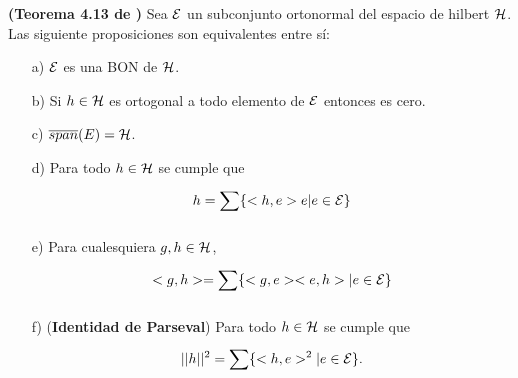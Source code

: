 \begin{teo} \label{thm: Coway, 4.13}
\textbf{(Teorema 4.13 de \cite{conway} )}
Sea $\mathcal{E}$ un subconjunto ortonormal del espacio
de hilbert $\mathcal{H}$.
Las siguiente proposiciones son equivalentes entre sí:
\begin{itemize}
\item[a)] $\mathcal{E}$ es una BON de $\mathcal{H}$.
\item[b)] Si $h \in \mathcal{H}$ es ortogonal a todo elemento de 
$\mathcal{E}$ entonces es cero.
\item[c)] $\overline{span}(E)= \mathcal{H} $.
\item[d)] Para todo $h \in \mathcal{H}$ se cumple que
\[
h = \sum\limits_{}^{}\{ <h,e> e | e \in \mathcal{E} \}
\]
\item[e)] Para cualesquiera $g, h \in \mathcal{H}$,
\[
<g,h>= \sum\limits_{}^{}\{ <g,e> <e,h> | e \in \mathcal{E} \}
\]
\item[f)](\textbf{Identidad de Parseval})
Para todo $h \in \mathcal{H}$ se cumple que
\[
||h||^{2}= \sum\limits_{}^{}\{ <h,e>^{2} | e \in \mathcal{E} \}.
\]
\end{itemize}
\end{teo}


